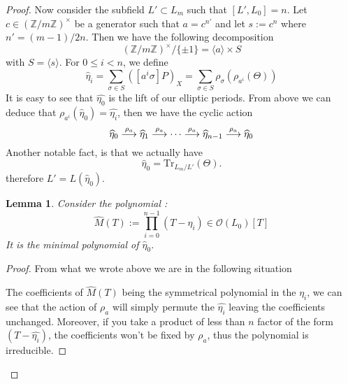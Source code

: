 \documentclass[12pt]{article}
\theoremstyle{plain}
\newtheorem{lemma}[theorem]{Lemma}
\theoremstyle{definition}
\def\Z{\ensuremath{\mathbb{Z}}}
\begin{document}
\begin{proof}
Now consider the subfield $L'\subset L_m$ such that $[L', L_0] = n$. Let 
$c\in(\Z/m\Z)^{\times}$ be a generator such that $a=c^{n'}$ and let $s:=c^n$ 
where $n' = (m-1)/2n$. Then we have the following decomposition
\[
(\Z/m\Z)^{\times}/\lbrace{\pm1}\rbrace = \langle{a}\rangle \times S
\]
with $S = \langle{s}\rangle$. For $0 \leq i < n$, we define 
\begin{equation}
\widehat{\eta}_i = \sum_{\sigma\in S}{\left([a^i\sigma]P\right)_X} =
\sum_{\sigma\in S}{\rho_{\sigma}(\rho_{a^i}(\Theta))}
\end{equation}
It is easy to see that $\widehat{\eta_0}$ is the lift of our elliptic periods.
From above we can deduce that $\rho_{a^i}(\widehat{\eta}_0) = 
\widehat{\eta_i}$, then we have the cyclic action
\begin{equation}
\widehat{\eta}_0 \buildrel\rho_a\over\longrightarrow
\widehat{\eta}_1 \buildrel\rho_a\over\longrightarrow \dots 
\buildrel\rho_a\over\longrightarrow \widehat{\eta}_{n-1}
\buildrel\rho_a\over\longrightarrow \widehat{\eta}_0
\end{equation}
Another notable fact, is that we actually have
\begin{equation}
\widehat{\eta}_0=\text{Tr}_{L_m/L'}(\Theta).
\end{equation}
therefore $L' = L(\widehat{\eta}_0)$.

\begin{lemma}
Consider the polynomial :
\begin{equation}
\widehat{M}(T):=\prod_{i=0}^{n-1}{(T-\widehat{\eta}_i)}\in\mathcal{O}(L_0)[T]
\end{equation}
It is the minimal polynomial of $\widehat{\eta}_0$.
\end{lemma}

\begin{proof}
From what we wrote above we are in the following situation
\begin{center}
\end{center}
The coefficients of $\widehat{M}(T)$ being the symmetrical polynomial in the $\eta_i$, we
can see that the action of $\rho_a$ will simply permute the $\widehat{\eta_i}$
leaving the coefficients unchanged. Moreover, if you take a product of less than
$n$ factor of the form $(T - \widehat{\eta_i})$, the coefficients won't be fixed
by $\rho_a$, thus the polynomial is irreducible.


\end{proof}
\end{proof}
\end{document}
